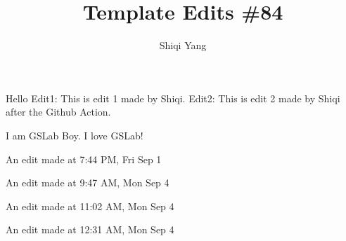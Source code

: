 \documentclass{report}
\title{\Huge{Template Edits \#84}\\}
\author{\huge{Shiqi Yang}}
\date{}
\begin{document}
\maketitle
Hello
Edit1: This is edit 1 made by Shiqi.
Edit2: This is edit 2 made by Shiqi after the Github Action.


I am GSLab Boy. I love GSLab!

An edit made at 7:44 PM, Fri Sep 1

An edit made at 9:47 AM, Mon Sep 4

An edit made at 11:02 AM, Mon Sep 4

An edit made at 12:31 AM, Mon Sep 4
\end{document}
